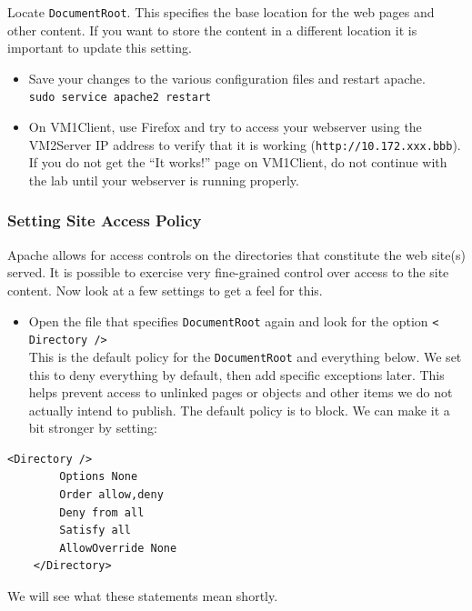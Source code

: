 \documentclass{article}
\begin{document}
Locate {\tt DocumentRoot}. This specifies the base location for the web pages and other content. If you want to store the content in a different location it is important to update this setting.


\begin{itemize}
\item Save your changes to the various configuration files and restart apache.\\
{\tt sudo service apache2 restart}


\item On VM1Client, use Firefox and try to access your webserver using the VM2Server IP address to verify that it is working ({\tt http://10.172.xxx.bbb}). If you do not get the ``It works!'' page on VM1Client, do not continue with the lab until your webserver is running properly.  
\end{itemize}

\subsubsection{Setting Site Access Policy}

Apache allows for access controls on the directories that constitute the web site(s) served. It is possible to exercise very fine-grained control over access to the site content. Now look at a few settings to get a feel for this.
\begin{itemize}

\item Open the file that specifies {\tt DocumentRoot} again and look for the option {\tt < Directory />}\\
This is the default policy for the {\tt DocumentRoot} and everything below. We set this to deny everything by default, then add specific exceptions later. This helps prevent access to unlinked pages or objects and other items we do not actually intend to publish. The default policy is to block. We can make it a bit stronger by setting:
\end{itemize}

\begin{Verbatim}[frame=single]
	<Directory />
		Options None
		Order allow,deny
		Deny from all
		Satisfy all
		AllowOverride None
	</Directory> 
\end{Verbatim}
We will see what these statements mean shortly. 
\end{document}
